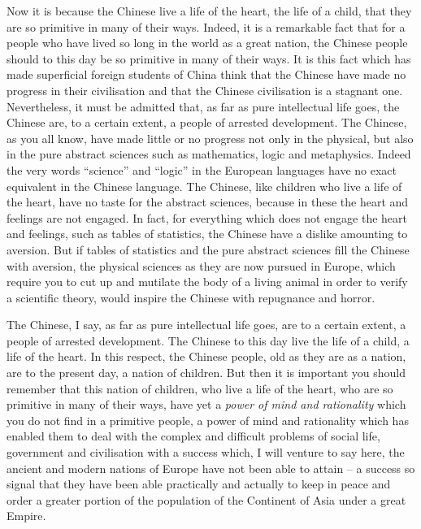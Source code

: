 Now it is because the Chinese live a life of the heart,
the life of a child, that they are so primitive in many of their ways.
Indeed, it is a remarkable fact that for a people who have lived so long in the world as a great nation,
the Chinese people should to this day be so primitive in many of their ways.
It is this fact which has made superficial foreign students of China think
that the Chinese have made no progress in their civilisation
and that the Chinese civilisation is a stagnant one. Nevertheless,
it must be admitted that,
as far as pure intellectual life goes,
the Chinese are, to a certain extent, a people of arrested development.
The Chinese, as you all know, have made little or no progress not only in the physical, but also in the pure abstract sciences such as mathematics,
logic and metaphysics.
Indeed the very words ``science'' and ``logic'' in the European languages have no exact equivalent in the Chinese language.
The Chinese, like children who live a life of the heart,
have no taste for the abstract sciences,
because in these the heart and feelings are not engaged.
In fact, for everything which does not engage the heart and feelings,
such as tables of statistics, the Chinese have a dislike amounting to aversion.
But if tables of statistics and the pure abstract sciences fill the Chinese with aversion,
the physical sciences as they are now pursued in Europe,
which require you to cut up and mutilate the body of a living animal in order to verify a scientific theory,
would inspire the Chinese with repugnance and horror.

The Chinese, I say, as far as pure intellectual life goes,
are to a certain extent, a people of arrested development.
The Chinese to this day live the life of a child, a life of the heart. In this respect, the Chinese people, old as they are as a nation, are to the present day, a nation of children. But then it is important you should remember that this nation of children, who live a life of the heart, who are so primitive in many of their ways, have yet a \emph{power of mind and rationality} which you do not find in a primitive people, a power of mind and rationality which has enabled them to deal with the complex and difficult problems of social life, government and civilisation with a success which, I will venture to say here, the ancient and modern nations of Europe have not been able to attain
-- a success so signal that they have been able practically and
actually to keep in peace and order a greater portion of the population of the Continent of Asia under a great Empire.

